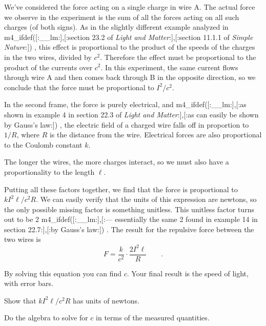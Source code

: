 
We've considered the force acting on a single charge in wire A. The
actual force we observe in the experiment is the sum of all the forces
acting on all such charges (of both signs).
As in the slightly different example analyzed in 
m4_ifdef([:__lm:],[:section 23.2 of \emph{Light and Matter}:],[:section 11.1.1 of \emph{Simple Nature}:])%
, this effect is proportional to the product
of the speeds of the charges in the two wires, divided by $c^2$.
Therefore the effect must
be proportional to the product of the currents over $c^2$. In this experiment, the
same current flows through wire A and then comes back through B in the opposite
direction, so we conclude that the force must be proportional to $I^2/c^2$.

In the second frame, the force is purely electrical, and 
m4_ifdef([:__lm:],[:as shown in example 4 in section 22.3 of \emph{Light and Matter}:],[:as can easily be shown by Gauss's law:])%
, the electric field of a charged
wire falls off in proportion to $1/R$, where $R$ is the distance from the
wire. Electrical forces are also proportional to the Coulomb constant $k$.

The longer the wires, the more charges interact, so we must also have a
proportionality to the length $\ell$.

Putting all these factors together, we find that the force
is proportional to $kI^2\ell/c^2R$. We can easily verify that the units of this expression
are newtons, so the only possible missing factor is something unitless. This
unitless factor turns out to be 2 
m4_ifdef([:__lm:],[:--- essentially the same 2 found in example 14 in section 22.7:],[:by Gauss's law:])%
.
The result for the repulsive force between the two wires is
\begin{equation*}
  F = \frac{k}{c^2} \cdot \frac{2I^2\ell}{R} \qquad .
\end{equation*}

By solving this equation you can find $c$.
Your final result is the speed of light, with error bars.

\prelab

\lasersafety

\prelabquestion Show that  $kI^2\ell/c^2R$ has units of newtons.

\prelabquestion Do the algebra to solve for $c$ in terms of the measured quantities.
